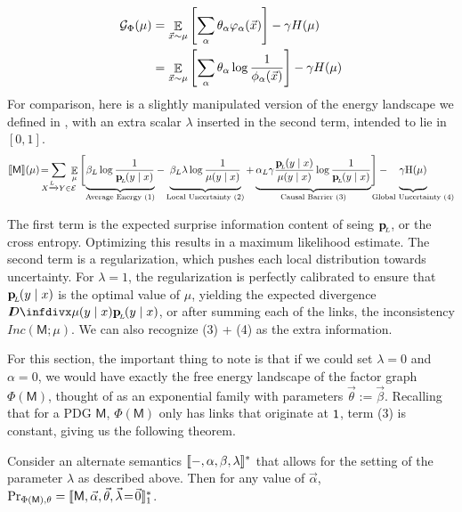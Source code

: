 \documentclass{article}
\DeclarePairedDelimiter{\UD}{\llbracket}{\rrbracket^*}
\newcommand{\bp}[1][L]{\mat{p}_{\!_#1\!}}
\newcommand{\Ed}{\mathcal E}
\newcommand{\sfM}{\mathsf M}
\newcommand\inconsist{\mathit{Inc}}
\numberwithin{equation}{section}
\begin{document}
	\begin{align*}
		\mathcal G_\Phi(\mu) &=  \mathop{\mathbb E}_{\vec x \sim \mu} \left[\sum_\alpha \theta_\alpha \varphi_\alpha(\vec x) \right] - \gamma H(\mu) \\
			&= \mathop{\mathbb E}_{\vec x \sim \mu} \left[\sum_\alpha \theta_\alpha \log \frac{1}{\phi_\alpha(\vec x)} \right] - \gamma H(\mu)
	\end{align*}
	For comparison, here is a slightly manipulated version of the energy landscape we defined in , with an extra scalar $\lambda$ inserted in the second term, intended to lie in $[0,1]$.
	\begin{equation*}
		\bbr{\sfM}(\mu) \!=\mskip-18mu \sum_{ X \xrightarrow{\!\!L} Y  \in \Ed } \!\!\!\!\E_\mu  \Bigg[\!
			\underbrace{\beta_L \log \frac{1}{\bp(y\mid x)} \vphantom{\Bigg|}}_{\text{Average Energy (1)}}  - 
			\underbrace{\beta_L \lambda \log \frac{1}{\mu(y \mid x)}  \vphantom{\Bigg|}}_{\text{Local Uncertainty (2)}}  + 
			\underbrace{\alpha_L \gamma \frac{\bp(y \mid x)}{\mu(y \mid x)}\log \frac{1}{\bp(y\mid x)}  \vphantom{\Bigg|}}_{\text{Causal Barrier (3)}}\! \Bigg] - 
			\mskip-31mu\underbrace{\gamma \H(\mu) \vphantom{\Bigg|} }_{\text{Global Uncertainty (4)}}
	\end{equation*}

	The first term is the expected surprise information content of seing $\bp$, or the cross entropy. Optimizing this results in a maximum likelihood estimate. The second term is a regularization, which pushes each local distribution towards uncertainty. For $\lambda = 1$, the regularization is perfectly calibrated to ensure that $\bp(y \mid x)$ is the optimal value of $\mu$, yielding the expected divergence $\kldiv{\mu(y\mid x)}{\bp(y\mid x)}$, or after summing each of the links, the inconsistency $\inconsist(\sfM ; \mu)$. We can also recognize (3) + (4) as the extra information.
	
	For this section, the important thing to note is that if we could set $\lambda = 0$ and $\alpha = 0$, we would have exactly the free energy landscape of the factor graph $\Phi(\sfM)$, thought of as an exponential family with parameters $\vec \theta := \vec \beta$. Recalling that for a PDG $\sfM$, $\Phi(\sfM)$ only has links that originate at $\sf 1$, term (3) is constant, giving us the following theorem.
	
	\begin{theorem}
		Consider an alternate semantics $\UD{-, \alpha, \beta, \lambda}$ that allows for the setting of the parameter $\lambda$ as described above. Then for any value of $\vec\alpha$, $\Pr_{\Phi(\sfM),\theta} = \UD{\sfM, \vec{\alpha}, \vec{\theta}, \vec\lambda \!=\! \vec 0 }_1$.
	\end{theorem}
\end{document}
